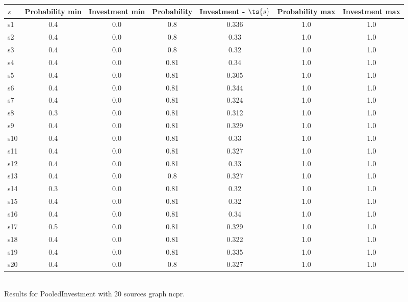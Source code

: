 \documentclass{article}
\begin{document}
\noindent\begin{tabular}{|l|c|c|c|c|c|c|}
\hline
$s$& Probability min & Investment min & Probability & Investment - $\ts{s}$ & Probability max & Investment max\\
\hline
s1 &0.4 & 0.0 & 0.8 & 0.336 & 1.0 & 1.0\\
\hline
s2 &0.4 & 0.0 & 0.8 & 0.33 & 1.0 & 1.0\\
\hline
s3 &0.4 & 0.0 & 0.8 & 0.32 & 1.0 & 1.0\\
\hline
s4 &0.4 & 0.0 & 0.81 & 0.34 & 1.0 & 1.0\\
\hline
s5 &0.4 & 0.0 & 0.81 & 0.305 & 1.0 & 1.0\\
\hline
s6 &0.4 & 0.0 & 0.81 & 0.344 & 1.0 & 1.0\\
\hline
s7 &0.4 & 0.0 & 0.81 & 0.324 & 1.0 & 1.0\\
\hline
s8 &0.3 & 0.0 & 0.81 & 0.312 & 1.0 & 1.0\\
\hline
s9 &0.4 & 0.0 & 0.81 & 0.329 & 1.0 & 1.0\\
\hline
s10 &0.4 & 0.0 & 0.81 & 0.33 & 1.0 & 1.0\\
\hline
s11 &0.4 & 0.0 & 0.81 & 0.327 & 1.0 & 1.0\\
\hline
s12 &0.4 & 0.0 & 0.81 & 0.33 & 1.0 & 1.0\\
\hline
s13 &0.4 & 0.0 & 0.8 & 0.327 & 1.0 & 1.0\\
\hline
s14 &0.3 & 0.0 & 0.81 & 0.32 & 1.0 & 1.0\\
\hline
s15 &0.4 & 0.0 & 0.81 & 0.32 & 1.0 & 1.0\\
\hline
s16 &0.4 & 0.0 & 0.81 & 0.34 & 1.0 & 1.0\\
\hline
s17 &0.5 & 0.0 & 0.81 & 0.329 & 1.0 & 1.0\\
\hline
s18 &0.4 & 0.0 & 0.81 & 0.322 & 1.0 & 1.0\\
\hline
s19 &0.4 & 0.0 & 0.81 & 0.335 & 1.0 & 1.0\\
\hline
s20 &0.4 & 0.0 & 0.8 & 0.327 & 1.0 & 1.0\\
\hline
\end{tabular}\\

\noindent Results for PooledInvestment with 20 sources graph ncpr.
\end{document}
